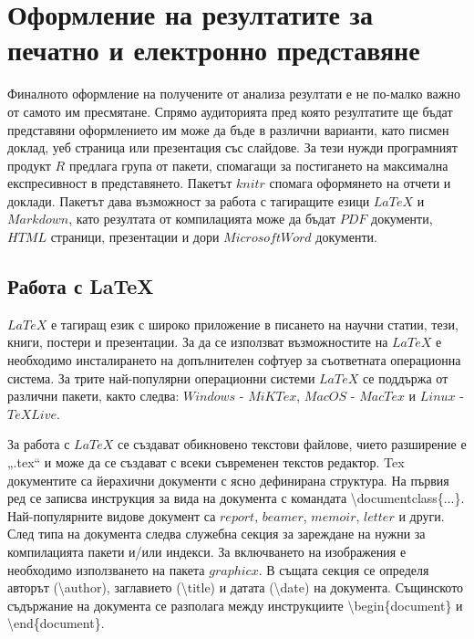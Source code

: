 \newpage
\chapter{Оформление на резултатите за печатно и електронно представяне}
\label{chapter11}
\thispagestyle{empty}

Финалното оформление на получените от анализа резултати е не по-малко важно от самото им пресмятане. Спрямо аудиторията пред която резултатите ще бъдат представяни оформлението им може да бъде в различни варианти, като писмен доклад, уеб страница или презентация със слайдове. За тези нужди програмният продукт $R$ предлага група от пакети, спомагащи за постигането на максимална експресивност в представянето. Пакетът $knitr$ спомага оформянето на отчети и доклади. Пакетът дава възможност за работа с тагиращите езици $LaTeX$ и $Markdown$, като резултата от компилацията може да бъдат $PDF$ документи, $HTML$ страници, презентации и дори $Microsoft Word$ документи. 

\section{Работа с LaTeX}

$LaTeX$ е тагиращ език с широко приложение в писането на научни статии, тези, книги, постери и презентации. За да се използват възможностите на $LaTeX$ е необходимо инсталирането на допълнителен софтуер за съответната операционна система. За трите най-популярни операционни системи $LaTeX$ се поддържа от различни пакети, както следва: $Windows$ - $MiKTex$, $MacOS$ - $MacTex$ и $Linux$ - $TeX Live$.

За работа с $LaTeX$ се създават обикновено текстови файлове, чието разширение е „.tex“ и може да се създават с всеки съвременен текстов редактор. Tex документите са йерахични документи с ясно дефинирана структура. На първия ред се записва инструкция за вида на документа с командата \textbackslash documentclass\{...\}. Най-популярните видове документ са $report$, $beamer$, $memoir$, $letter$ и други. След типа на документа следва служебна секция за зареждане на нужни за компилацията пакети и/или индекси. За включването на изображения е необходимо използването на пакета $graphicx$. В същата секция се определя авторът (\textbackslash author), заглавието (\textbackslash title) и датата (\textbackslash date) на документа. Същинското съдържание на документа се разполага между инструкциите \textbackslash begin\{document\} и \textbackslash end\{document\}.

